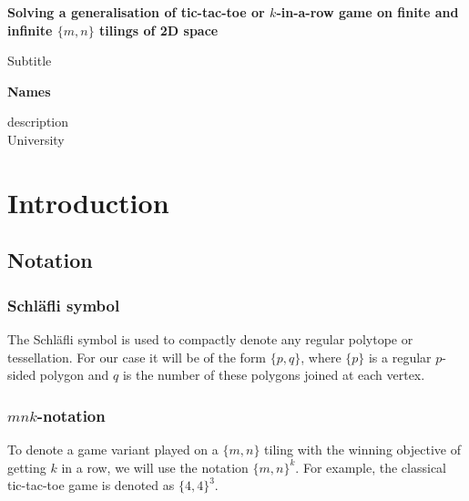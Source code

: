 \documentclass{article}
\begin{document}
    \begin{center}
        \vspace*{1cm}
            
        \Huge
        \textbf{Solving a generalisation of tic-tac-toe or $k$-in-a-row game on finite and infinite $\{m, n\}$ tilings of 2D space}
            
        \vspace{0.5cm}
        \LARGE
        Subtitle
            
        \vspace{1.5cm}

        \large
        \textbf{Names}
            
         \vspace{0.5cm}
        description\\
        \vspace{0.5cm}
        University

    \end{center}
    \newpage
    \tableofcontents
    \newpage

    \section{Introduction}

        \subsection{Notation}

            \subsubsection{Schläfli symbol}

                The Schläfli symbol is used to compactly denote any regular polytope or tessellation. For our case it will be of the form $\{p, q\}$, where $\{p\}$ is a regular $p$-sided polygon and $q$ is the number of these polygons joined at each vertex.

            \subsubsection{$mnk$-notation}

                To denote a game variant played on a $\{m, n\}$ tiling with the winning objective of getting $k$ in a row, we will use the notation $\{m, n\}^k$. For example, the classical tic-tac-toe game is denoted as $\{4, 4\}^3$.
\end{document}
